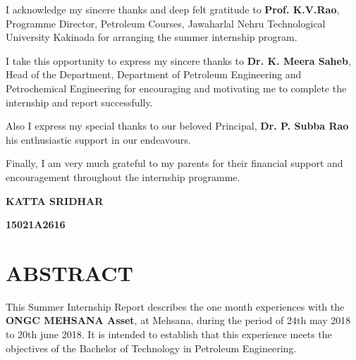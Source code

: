 \documentclass[11pt,a4paper]{report}
\begin{document}
\vspace{1em}


I acknowledge my sincere thanks and deep felt gratitude to \textbf{Prof. K.V.Rao}, Programme Director, Petroleum Courses, Jawaharlal Nehru Technological University Kakinada for arranging the summer internship program.

\vspace{1em}

I take this opportunity to express my sincere thanks to \textbf{Dr. K. Meera Saheb}, Head of the Department, Department of Petroleum Engineering and Petrochemical Engineering for encouraging and motivating me to complete the internship and report successfully.

\vspace{1em}

Also I express my special thanks to our beloved Principal, \textbf{Dr. P. Subba Rao} his enthusiastic support in our endeavours.

\vspace{1em}

Finally, I am very much grateful to my parents for their financial support and encouragement throughout the internship programme.

\vspace{1em}

\hfill \textbf{KATTA SRIDHAR}

\hfill \textbf{15021A2616} \hspace{0.005\textwidth}

\newpage

\tableofcontents
\setlength{\voffset}{-1in}

\newpage

\section*{\centering ABSTRACT}

\setlength{\voffset}{+0.5in}

\onehalfspacing


This  Summer Internship Report  describes the one month experiences with the \textbf{ONGC MEHSANA Asset}, at Mehsana,
during the period of 24th may 2018 to 20th june 2018. It is  intended to  establish that this  experience 
meets  the  objectives  of the Bachelor of Technology in Petroleum Engineering.

\vspace{1em}
\end{document}
